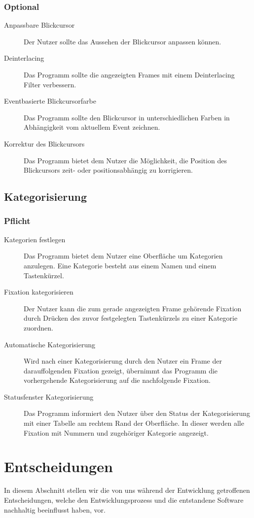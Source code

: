 \documentclass[a4paper,draft]{scrartcl}
\begin{document}
\subsubsection{Optional}
\begin{description}
\item[Anpassbare Blickcursor] Der Nutzer sollte das Aussehen der Blickcursor anpassen können. 
\item[Deinterlacing] Das Programm sollte die angezeigten Frames mit einem Deinterlacing Filter verbessern.
\item[Eventbasierte Blickcursorfarbe] Das Programm sollte den Blickcursor in unterschiedlichen Farben in Abhängigkeit vom aktuellem Event zeichnen.
\item[Korrektur des Blickcursors] Das Programm bietet dem Nutzer die Möglichkeit, die Position des Blickcursors zeit- oder positionsabhängig zu korrigieren.
\end{description}
\subsection{Kategorisierung}
\subsubsection{Pflicht}
\begin{description}
\item[Kategorien festlegen] Das Programm bietet dem Nutzer eine Oberfläche um Kategorien anzulegen. Eine Kategorie besteht aus einem Namen und einem Tastenkürzel.
\item[Fixation kategorisieren] Der Nutzer kann die zum gerade angezeigten Frame gehörende Fixation durch Drücken des zuvor festgelegten Tastenkürzels zu einer Kategorie zuordnen.
\item[Automatische Kategorisierung] Wird nach einer Kategorisierung durch den Nutzer ein Frame der darauffolgenden Fixation gezeigt, übernimmt das Programm die vorhergehende Kategorisierung auf die nachfolgende Fixation.
\item[Statusfenster Kategorisierung] Das Programm informiert den Nutzer über den Status der Kategorisierung mit einer Tabelle am rechtem Rand der Oberfläche. In dieser werden alle Fixation mit Nummern und zugehöriger Kategorie angezeigt.
\end{description}

\section{Entscheidungen}
In diesem Abschnitt stellen wir die von uns w\"ahrend der Entwicklung getroffenen Entscheidungen, welche den Entwicklungsprozess und die entstandene Software nachhaltig beeinflusst haben, vor.
\end{document}
